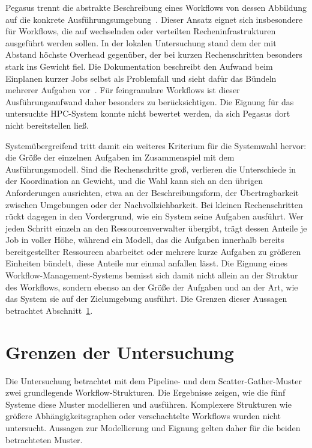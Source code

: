 Pegasus trennt die abstrakte Beschreibung eines Workflows von
dessen Abbildung auf die konkrete
Ausführungsumgebung~\cite[S.~18--20]{deelman2015pegasus}. Dieser
Ansatz eignet sich insbesondere für Workflows, die auf wechselnden
oder verteilten Recheninfrastrukturen ausgeführt werden sollen. In
der lokalen Untersuchung stand dem der mit Abstand höchste Overhead
gegenüber, der bei kurzen Rechenschritten besonders stark ins
Gewicht fiel. Die Dokumentation beschreibt den Aufwand beim
Einplanen kurzer Jobs selbst als Problemfall und sieht dafür das
Bündeln mehrerer Aufgaben vor~\cite{pegasusdocs-optimizing}. Für
feingranulare Workflows ist dieser Ausführungsaufwand daher
besonders zu berücksichtigen. Die Eignung für das untersuchte
HPC-System konnte nicht bewertet werden, da sich Pegasus dort nicht bereitstellen ließ.

Systemübergreifend tritt damit ein weiteres Kriterium für die
Systemwahl hervor: die Größe der einzelnen Aufgaben im Zusammenspiel
mit dem Ausführungsmodell. Sind die Rechenschritte groß, verlieren
die Unterschiede in der Koordination an Gewicht, und die Wahl kann
sich an den übrigen Anforderungen ausrichten, etwa an der
Beschreibungsform, der Übertragbarkeit zwischen Umgebungen oder der
Nachvollziehbarkeit. Bei kleinen Rechenschritten rückt dagegen in
den Vordergrund, wie ein System seine Aufgaben ausführt. Wer jeden
Schritt einzeln an den Ressourcenverwalter übergibt, trägt dessen
Anteile je Job in voller Höhe, während ein Modell, das die Aufgaben
innerhalb bereits bereitgestellter Ressourcen abarbeitet oder
mehrere kurze Aufgaben zu größeren Einheiten bündelt, diese Anteile
nur einmal anfallen lässt. Die Eignung eines
Workflow-Management-Systems bemisst sich damit nicht allein an der
Struktur des Workflows, sondern ebenso an der Größe der Aufgaben
und an der Art, wie das System sie auf der Zielumgebung ausführt.
Die Grenzen dieser Aussagen betrachtet
Abschnitt~\ref{sec:diskussion:grenzen}.

\section{Grenzen der Untersuchung}
\label{sec:diskussion:grenzen}

Die Untersuchung betrachtet mit dem Pipeline- und dem
Scatter-Gather-Muster zwei grundlegende Workflow-Strukturen. Die
Ergebnisse zeigen, wie die fünf Systeme diese Muster modellieren
und ausführen. Komplexere Strukturen wie größere
Abhängigkeitsgraphen oder verschachtelte Workflows wurden nicht untersucht. Aussagen zur Modellierung und Eignung gelten daher für die beiden betrachteten
Muster.

